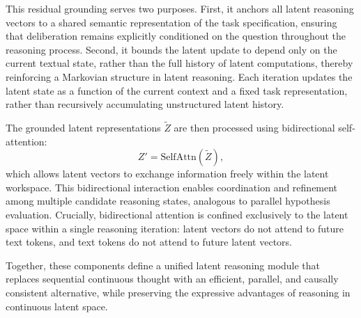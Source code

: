 This residual grounding serves two purposes. First, it anchors all latent reasoning vectors to a shared semantic representation of the task specification, ensuring that deliberation remains explicitly conditioned on the question throughout the reasoning process. Second, it bounds the latent update to depend only on the current textual state, rather than the full history of latent computations, thereby reinforcing a Markovian structure in latent reasoning. Each iteration updates the latent state as a function of the current context and a fixed task representation, rather than recursively accumulating unstructured latent history.

The grounded latent representations $\tilde{Z}$ are then processed using bidirectional self-attention:
\[
Z' = \mathrm{SelfAttn}(\tilde{Z}),
\]
which allows latent vectors to exchange information freely within the latent workspace. This bidirectional interaction enables coordination and refinement among multiple candidate reasoning states, analogous to parallel hypothesis evaluation. Crucially, bidirectional attention is confined exclusively to the latent space within a single reasoning iteration: latent vectors do not attend to future text tokens, and text tokens do not attend to future latent vectors.

Together, these components define a unified latent reasoning module that replaces sequential continuous thought with an efficient, parallel, and causally consistent alternative, while preserving the expressive advantages of reasoning in continuous latent space.